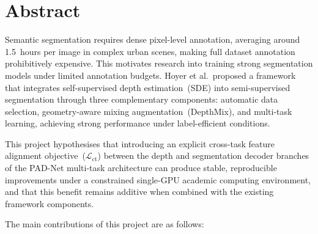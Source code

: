 \documentclass[
  oneside,
  author={Shijie Lu},
  degree={BSc},
  title={Label-Efficient Semantic Segmentation via Self-Supervised Depth Estimation and Cross-Task Consistency},
  unit={COMS30045},
  subtitle={}
]{dissertation}
\begin{document}
\maketitle

\frontmatter

\chapter*{Abstract}

\noindent
Semantic segmentation requires dense pixel-level annotation, averaging
around 1.5~hours per image in complex urban scenes, making full dataset
annotation prohibitively expensive. This motivates research into training
strong segmentation models under limited annotation budgets.
Hoyer et al.\ proposed a framework that integrates self-supervised depth
estimation~(SDE) into semi-supervised segmentation through three
complementary components: automatic data selection, geometry-aware mixing
augmentation~(DepthMix), and multi-task learning, achieving strong
performance under label-efficient conditions.

This project hypothesises that introducing an explicit cross-task
feature alignment objective~($\mathcal{L}_\text{ct}$) between the depth
and segmentation decoder branches of the PAD-Net multi-task architecture
can produce stable, reproducible improvements under a constrained
single-GPU academic computing environment, and that this benefit remains
additive when combined with the existing framework components.

The main contributions of this project are as follows:
\end{document}
